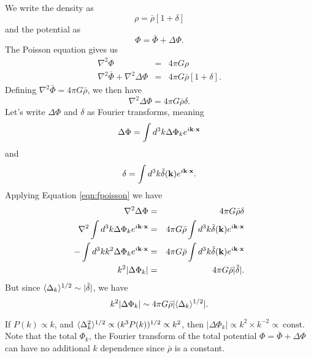 \documentclass[]{article}
\begin{document}
We write the density as
\begin{equation}
\rho = \bar{\rho}[1 + \delta]
\end{equation}
\noindent
and the potential as
\begin{equation}
\Phi = \bar{\Phi} + \Delta \Phi.
\end{equation}
\noindent
The Poisson equation gives us
\begin{eqnarray}
\nabla^2 \Phi &=& 4\pi G \rho\\
\nabla^2 \bar{\Phi} + \nabla^2 \Delta \Phi &=& 4\pi G \bar{\rho}[1 + \delta].
\end{eqnarray}
\noindent
Defining $\nabla^2{} \bar{\Phi} = 4 \pi G \bar{\rho}$, we then have
\begin{equation}
\label{eqn:fpoisson}
\nabla^2 \Delta \Phi = 4\pi G \bar{\rho} \delta.
\end{equation}
\noindent
Let's write $\Delta \Phi$ and $\delta$ as Fourier transforms, meaning
\begin{equation}
\Delta \Phi = \int d^3 k \Delta \Phi_k e^{i \mathbf{k} \cdot \mathbf{x}}
\end{equation}
\noindent
and
\begin{equation}
\delta = \int d^3 k \tilde{\delta}(\mathbf{k}) e^{i \mathbf{k} \cdot \mathbf{x}}.
\end{equation}
\noindent
Applying Equation \ref{eqn:fpoisson} we have
\begin{eqnarray}
\nabla^2 \Delta \Phi &=& 4\pi G \bar{\rho} \delta \\
\nabla^2 \int d^3 k \Delta \Phi_k e^{i \mathbf{k} \cdot \mathbf{x}} &=& 4\pi G \bar{\rho}\int d^3 k \tilde{\delta}(\mathbf{k}) e^{i \mathbf{k} \cdot \mathbf{x}} \\
- \int d^3 k k^2 \Delta \Phi_k e^{i \mathbf{k} \cdot \mathbf{x}}&=& 4\pi G \bar{\rho}\int d^3 k \tilde{\delta}(\mathbf{k}) e^{i \mathbf{k} \cdot \mathbf{x}} \\
k^2 |\Delta \Phi_k| &=& 4\pi G \bar{\rho} |\tilde{\delta}|.
\end{eqnarray}
\noindent
But since $\langle\Delta_k\rangle^{1/2} \sim | \tilde{\delta} |$, we have
\begin{equation}
k^2 |\Delta \Phi_k| \sim 4\pi G \bar{\rho} |\langle\Delta_k\rangle^{1/2}|.
\end{equation}


If $P(k) \propto k$, and $\langle\Delta_k^2\rangle^{1/2} \propto (k^3 P(k))^{1/2} \propto k^2$, then $|\Delta \Phi_k| \propto k^2 \times k^{-2} \propto~\mathrm{const}$.  Note that the total $\Phi_k$, the Fourier transform of the total potential $\Phi = \bar{\Phi} + \Delta \Phi$ can have no additional $k$ dependence since $\bar{\rho}$ is a constant.
\end{document}
